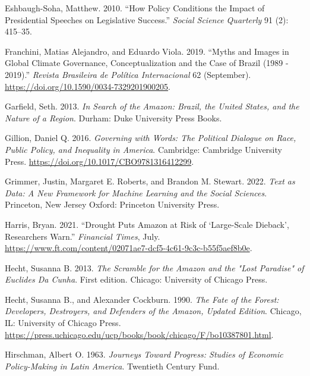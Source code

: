 \documentclass[
]{article}
\newlength{\cslhangindent}
\newlength{\cslentryspacingunit} %
\newenvironment{CSLReferences}[2] %
 {%
  \setlength{\parindent}{0pt}
  \ifodd #1
  \let\oldpar\par
  \def\par{\hangindent=\cslhangindent\oldpar}
  \fi
  \setlength{\parskip}{#2\cslentryspacingunit}
 }%
 {}
\begin{document}
\begin{CSLReferences}{1}{0}
\leavevmode{}%
Eshbaugh-Soha, Matthew. 2010. {``How Policy Conditions the Impact of
Presidential Speeches on Legislative Success.''} \emph{Social Science
Quarterly} 91 (2): 415--35.

\leavevmode{}%
Franchini, Matias Alejandro, and Eduardo Viola. 2019. {``Myths and
Images in Global Climate Governance, Conceptualization and the Case of
Brazil (1989 - 2019).''} \emph{Revista Brasileira de Política
Internacional} 62 (September).
\url{https://doi.org/10.1590/0034-7329201900205}.

\leavevmode{}%
Garfield, Seth. 2013. \emph{In Search of the Amazon: Brazil, the United
States, and the Nature of a Region}. Durham: Duke University Press
Books.

\leavevmode{}%
Gillion, Daniel Q. 2016. \emph{Governing with Words: The Political
Dialogue on Race, Public Policy, and Inequality in America}. Cambridge:
Cambridge University Press.
\url{https://doi.org/10.1017/CBO9781316412299}.

\leavevmode{}%
Grimmer, Justin, Margaret E. Roberts, and Brandon M. Stewart. 2022.
\emph{Text as Data: A New Framework for Machine Learning and the Social
Sciences}. Princeton, New Jersey Oxford: Princeton University Press.

\leavevmode{}%
Harris, Bryan. 2021. {``Drought Puts Amazon at Risk of {`}Large-Scale
Dieback{'}, Researchers Warn.''} \emph{Financial Times}, July.
\url{https://www.ft.com/content/02071ae7-dcf5-4c61-9c3c-b55f5aef8b0e}.

\leavevmode{}%
Hecht, Susanna B. 2013. \emph{The Scramble for the Amazon and the
{"}Lost Paradise{"} of Euclides Da Cunha}. First edition. Chicago:
University of Chicago Press.

\leavevmode{}%
Hecht, Susanna B., and Alexander Cockburn. 1990. \emph{The Fate of the
Forest: Developers, Destroyers, and Defenders of the Amazon, Updated
Edition}. Chicago, IL: University of Chicago Press.
\url{https://press.uchicago.edu/ucp/books/book/chicago/F/bo10387801.html}.

\leavevmode{}%
Hirschman, Albert O. 1963. \emph{Journeys Toward Progress: Studies of
Economic Policy-Making in Latin America}. Twentieth Century Fund.


\end{CSLReferences}
\end{document}
